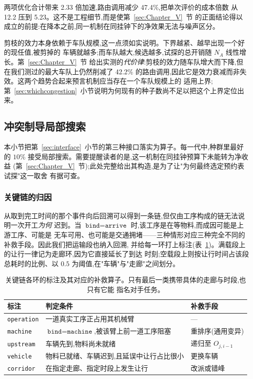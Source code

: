 \documentclass[manuscript,screen,review]{acmart}
\newcommand{\RouteCallCutLo}{42.2\%}     %
\newcommand{\SpeedupProbe}{2.33}
\newcommand{\RouteCallCut}{47.4\%}
\newcommand{\CostMultBefore}{12.2}
\newcommand{\CostMultAfter}{5.23}
\begin{document}
两项优化合计带来 \SpeedupProbe{} 倍加速,路由调用减少 \RouteCallCut{},把单次评价的成本倍数
从 \CostMultBefore{} 压到 \CostMultAfter{}。这不是工程细节,而是使第~\ref{sec:Chapter_V}~节
的正面结论得以成立的前提:在降本之前,同一机制在同挂钟下的净效果无法与噪声区分。

剪枝的效力本身依赖于车队规模,这一点须如实说明。下界越紧、越早出现一个好的现任值,被剪掉的
车辆就越多;而车队越大,候选越多,试探的总开销随 $N_A$ 线性增长。第~\ref{sec:Chapter_V}~节
给出实测的\emph{代价律}:剪枝的效力随车队增大而下降,但在我们测过的最大车队上仍然削减了
\RouteCallCutLo{} 的路由调用,因此它是效力衰减而非失效。这两个趋势合起来预言机制应当存在一个车队规模上的
适用上界;第~\ref{sec:whichcongestion}~小节说明为何现有的种子数尚不足以把这个上界定位出来。

\subsection{冲突制导局部搜索}
\label{sec:ls}

本小节把第~\ref{sec:interface}~小节的第三种接口落实为算子。每一代中,种群里最好的 $10\%$
接受局部搜索。需要提醒读者的是,这一机制在同挂钟预算下未能转为净收益
(第~\ref{sec:Chapter_V}~节);此处完整给出其构造,是为了让"为何最终选定预约表试探"这一取舍
有据可查。

\subsubsection{关键链的归因}
从取到完工时间的那个事件向后回溯可以得到一条链,但仅由工序构成的链无法说明一次开工\emph{为何}
迟到。当 $\texttt{bind}=\texttt{arrive}$ 时,该工序是在等物料,而成因可能是上游工序、可能是
无车可用、也可能是交通拥堵——三种情形对应三种完全不同的补救手段。因此我们把运输段也纳入回溯,
并给每一环打上标注(表~\ref{tab:attrib})。满载段上的让行一律记为走廊环,因为它直接延长了到达
时刻;空载段上则按让行时间占该段总耗时的比例、以 $0.5$ 为阈值,在"车辆"与"走廊"之间划分。

\begin{table}[t]
\caption{关键链各环的标注及其对应的补救算子。只有最后一类携带具体的走廊与时段,也只有它能
指名对手任务。}
\label{tab:attrib}
\footnotesize
\begin{tabular}{@{}llp{2.55cm}@{}}
\toprule
标注 & 判定条件 & 补救手段 \\
\midrule
\texttt{operation} & 一道真实工序正占用其机械臂 & --- \\
\texttt{machine} & $\texttt{bind}=\texttt{machine}$,被该臂上前一道工序阻塞
  & 重排序(通用变异) \\
\texttt{upstream} & 车辆先到,物料尚未就绪 & 递归至 $O_{j,i-1}$ \\
\texttt{vehicle} & 物料已就绪、车辆迟到,且延误中让行占比很小 & 更换车辆 \\
\texttt{corridor} & 在指定走廊、指定时段上发生让行 & 改派或错峰 \\
\bottomrule
\end{tabular}
\end{table}
\end{document}
